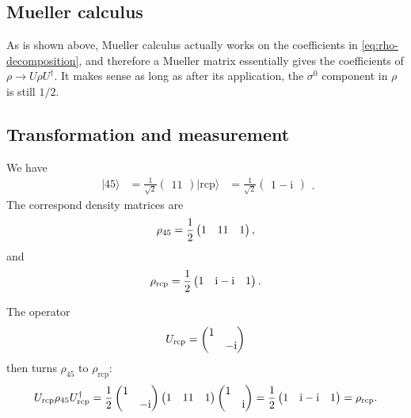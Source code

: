 \documentclass[hyperref, a4paper]{article}
\newcommand*{\ii}{\mathrm{i}}
\def\\{}%
\begin{document}
\subsection{Mueller calculus}

As is shown above, 
Mueller calculus actually works on the coefficients in \eqref{eq:rho-decomposition},
and therefore a Mueller matrix 
essentially gives the coefficients of $\rho \to U \rho U^\dagger$.
It makes sense as long as after its application, 
the $\sigma^0$ component in $\rho$ is still $1/2$.

\subsection{Transformation and measurement}

We have 
\begin{equation}
    \begin{aligned}
        |45\rangle & =\frac{1}{\sqrt{2}}\left(\begin{array}{l}
        1 \\
        1
        \end{array}\right) \\
        |\text{rcp} \rangle & =\frac{1}{\sqrt{2}}\left(\begin{array}{c}
        1 \\
        -\ii
        \end{array}\right)
        \end{aligned}.
\end{equation}
The correspond density matrices are 
\begin{equation}
    \rho_{45} = \frac{1}{2} \pmqty{1 & 1 \\ 1 & 1},
\end{equation}
and 
\begin{equation}
    \rho_{\text{rcp}} = \frac{1}{2} \pmqty{ 1 & \ii \\ - \ii & 1 }.
\end{equation}

The operator 
\begin{equation}
    U_{\text{rcp}} = \pmqty{
        \dmat{1 , - \ii}
    }
\end{equation}
then turns $\rho_{45}$ to $\rho_{\text{rcp}}$: 
\begin{equation}
    U_{\text{rcp}} \rho_{45} U_{\text{rcp}}^\dagger 
    = \frac{1}{2} \pmqty{\dmat{1, - \ii}}
    \pmqty{1 & 1 \\ 1 & 1}
    \pmqty{\dmat{1, \ii}}
    = \frac{1}{2} \pmqty{
        1 & \ii \\ - \ii & 1
    } = \rho_{\text{rcp}}.
\end{equation}
\end{document}
